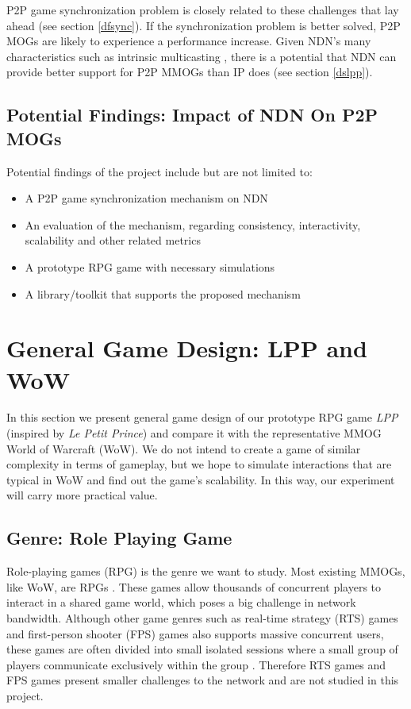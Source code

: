 \documentclass{article}
\begin{document}
P2P game synchronization problem is closely related to these challenges that lay ahead (see section \ref{dfsync}). If the synchronization problem is better solved, P2P MOGs are likely to experience a performance increase. Given NDN's many characteristics such as intrinsic multicasting \cite{Jndn}, there is a potential that NDN can provide better support for P2P MMOGs than IP does (see section \ref{dslpp}).

\subsection{Potential Findings: Impact of NDN On P2P MOGs}
Potential findings of the project include but are not limited to:
\begin{itemize}
\item A P2P game synchronization mechanism on NDN
\item An evaluation of the mechanism, regarding consistency, interactivity, scalability and other related metrics
\item A prototype RPG game with necessary simulations
\item A library/toolkit that supports the proposed mechanism
\end{itemize}



\section{General Game Design: LPP and WoW}
\label{ggd}
In this section we present general game design of our prototype RPG game \emph{LPP} (inspired by \emph{Le Petit Prince}) and compare it with the representative MMOG World of Warcraft (WoW). We do not intend to create a game of similar complexity in terms of gameplay, but we hope to simulate interactions that are typical in WoW and find out the game's scalability. In this way, our experiment will carry more practical value.

\subsection{Genre: Role Playing Game}
Role-playing games (RPG) is the genre we want to study. Most existing MMOGs, like WoW, are RPGs \cite{Knutsson04}. These games allow thousands of concurrent players to interact in a shared game world, which poses a big challenge in network bandwidth. Although other game genres such as real-time strategy (RTS) games and first-person shooter (FPS) games also supports massive concurrent users, these games are often divided into small isolated sessions where a small group of players communicate exclusively within the group \cite{Knutsson04}. Therefore RTS games and FPS games present smaller challenges to the network and are not studied in this project.
\end{document}
